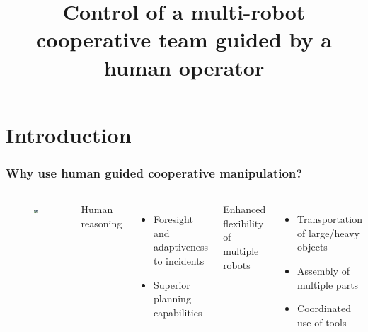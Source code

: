 \documentclass[student]{ITRslides}
\title{Control of a multi-robot cooperative team guided by a human operator}
\begin{document}
\begin{frame}
    \titlepage
\end{frame}


\section{Introduction}

\begin{frame}
	\frametitle{Why use human guided cooperative manipulation?}
		\begin{columns}[t]
	
			\begin{figure}
			\centering
			\includegraphics[width=0.98\textwidth]{mhi-meister45.jpg}
			\end{figure}
		
			
		Human reasoning
		\begin{itemize}
			\item Foresight and adaptiveness to incidents
			\item Superior planning capabilities
		\end{itemize}
		\vspace{15pt}
		Enhanced flexibility of multiple robots
			\begin{itemize}
				\item Transportation of large/heavy objects
	\item Assembly of multiple parts 
	\item Coordinated use of tools
			\end{itemize}
			
			\end{columns}
\end{frame}
\end{document}
